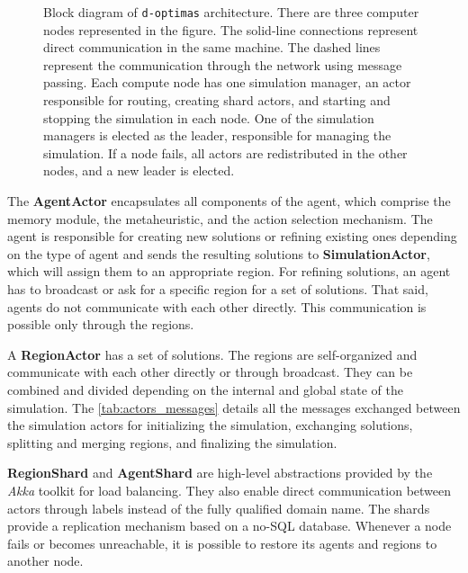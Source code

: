 \documentclass[preprint,12pt]{elsarticle}
\begin{document}
\begin{figure}[ht!]
    \centering
    
    \caption{Block diagram of \texttt{d-optimas} architecture. There are three computer nodes represented in the figure. The solid-line connections represent direct communication in the same machine. The dashed lines represent the communication through the network using message passing.  Each compute node has one simulation manager, an actor responsible for routing, creating shard actors, and starting and stopping the simulation in each node. One of the simulation managers is elected as the leader, responsible for managing the simulation. If a node fails, all actors are redistributed in the other nodes, and a new leader is elected.}
    \label{fig:d-optimas-new}
\end{figure}

The \textbf{AgentActor} encapsulates all components of the agent, which comprise the memory module, the metaheuristic, and the action selection mechanism. The agent is responsible for creating new solutions or refining existing ones depending on the type of agent and sends the resulting solutions to \textbf{SimulationActor}, which will assign them to an appropriate region. For refining solutions, an agent has to broadcast or ask for a specific region for a set of solutions. That said, agents do not communicate with each other directly. This communication is possible only through the regions. 

A \textbf{RegionActor} has a set of solutions. The regions are self-organized and communicate with each other directly or through broadcast. They can be combined and divided depending on the internal and global state of the simulation. The \autoref{tab:actors_messages} details all the messages exchanged between the simulation actors for initializing the simulation, exchanging solutions, splitting and merging regions, and finalizing the simulation.

 \textbf{RegionShard} and \textbf{AgentShard} are high-level abstractions provided by the \textit{Akka} toolkit for load balancing. They also enable direct communication between actors through labels instead of the fully qualified domain name. The shards provide a replication mechanism based on a no-SQL database. Whenever a node fails or becomes unreachable, it is possible to restore its agents and regions to another node. 
\end{document}
